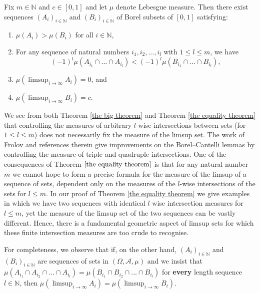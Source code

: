 \documentclass[12pt]{article}
\begin{document}
\begin{theorem} \label{the big theorem}
 Fix $m\in \mathbb{N}$ and $c \in [0,1]$ and let $\mu$ denote Lebesgue measure. Then there exist sequences $(A_i)_{i \in \mathbb{N}}$ and $(B_i)_{i \in \mathbb{N}}$ of Borel subsets of $[0,1]$ satisfying:
    \begin{enumerate}[label=(\roman*)]
    \item $\mu (A_i)  > \mu (B_i)$  for all $i \in \mathbb{N}$, 
     \item For any sequence of natural numbers $i_1,i_2,...,i_l$ with $1 \leq l \leq m$, we have \[(-1)^l\mu(A_{i_1} \cap ... \cap A_{i_l}) < (-1)^l \mu(B_{i_1} \cap ... \cap B_{i_l}),\] 
     \item $\mu(\limsup_{i \rightarrow \infty} A_i) =0$, and
     \item $\mu(\limsup_{i \rightarrow \infty} B_i) =c$.
    \end{enumerate}


\end{theorem}


We see from both Theorem \ref{the big theorem} and Theorem \ref{the equality theorem} that controlling the measures of arbitrary $l$-wise intersections between sets (for $1 \leq l \leq m $) does not necessarily fix the measure of the limsup set. The work of Frolov \cite{Frolov2012} and references therein give improvements on the Borel--Cantelli lemmas by controlling the measure of triple and quadruple intersections.  One of the consequences of Theorem $\ref{the equality theorem}$ is that for any natural number $m$ we cannot hope to form a precise formula for the measure of the limsup of a sequence of sets, dependent only on the measures of the $l$-wise intersections of the sets for $l \leq m$. In our proof of Theorem \ref{the equality theorem} we give examples in which we have two sequences with identical $l$ wise intersection measures for $l \leq m$, yet the measure of the limsup set of the two sequences can be vastly different. Hence, there is a fundamental geometric aspect of limsup sets for which these finite intersection measures are too crude to recognise. 


For completeness, we observe that if, on the other hand, $(A_i)_{i \in \mathbb{N}}$ and $(B_i)_{i \in \mathbb{N}}$ are sequences of sets in $(\Omega, \mathcal{A},\mu)$ and we insist that $\mu (A_{i_1} \cap A_{i_2} \cap ... \cap A_{i_l})=\mu (B_{i_1} \cap B_{i_2} \cap ... \cap B_{i_l})$ for \textbf{every} length sequence $l \in \mathbb{N}$, then $\mu(\limsup_{i \rightarrow\infty} A_i)=\mu(\limsup_{i \rightarrow \infty} B_i)$.
\end{document}
